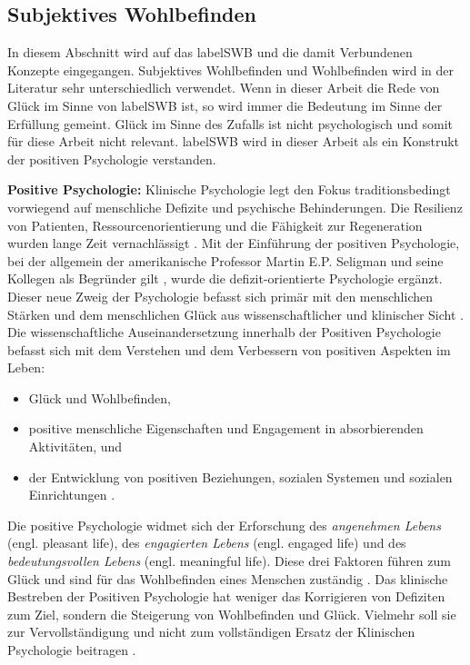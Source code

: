\subsection{Subjektives Wohlbefinden}\label{subsection.subjektivesWohlbefinden}
In diesem Abschnitt wird auf das \gls{labelSWB} und die damit Verbundenen Konzepte eingegangen. Subjektives Wohlbefinden und Wohlbefinden wird in der Literatur sehr unterschiedlich verwendet. Wenn in dieser Arbeit die Rede von Glück im Sinne von \gls{labelSWB} ist, so wird immer die Bedeutung im Sinne der Erfüllung gemeint. Glück im Sinne des Zufalls ist nicht psychologisch und somit für diese Arbeit nicht relevant. \Gls{labelSWB} wird in dieser Arbeit als ein Konstrukt der positiven Psychologie verstanden. 
\par
\textbf{Positive Psychologie:} 
Klinische Psychologie legt den Fokus traditionsbedingt vorwiegend auf menschliche Defizite und psychische Behinderungen. Die Resilienz von Patienten, Ressourcenorientierung und die Fähigkeit zur Regeneration wurden lange Zeit vernachlässigt \cite{Carr2011}. Mit der Einführung der positiven Psychologie, bei der allgemein der amerikanische Professor Martin E.P. Seligman und seine Kollegen als Begründer gilt \cite{Seligman2003}, wurde die defizit-orientierte Psychologie ergänzt. Dieser neue Zweig der Psychologie befasst sich primär mit den menschlichen Stärken und dem menschlichen Glück aus wissenschaftlicher und klinischer Sicht \cite{Carr2011}. Die wissenschaftliche Auseinandersetzung innerhalb der Positiven Psychologie befasst sich mit dem Verstehen und dem Verbessern von positiven Aspekten im Leben:
\begin{itemize}
    \item Glück und Wohlbefinden,
    \item positive menschliche Eigenschaften und Engagement in absorbierenden Aktivitäten, und
    \item der Entwicklung von positiven Beziehungen, sozialen Systemen und sozialen Einrichtungen \cite{Lopez2009, Seligman2003}.
\end{itemize}
Die positive Psychologie widmet sich der Erforschung des \textit{angenehmen Lebens} (engl. pleasant life), des \textit{engagierten Lebens} (engl. engaged life) und des \textit{bedeutungsvollen Lebens} (engl. meaningful life). Diese drei Faktoren führen zum Glück und sind für das Wohlbefinden eines Menschen zuständig \cite{Peterson2005}. Das klinische Bestreben der Positiven Psychologie hat weniger das Korrigieren von Defiziten zum Ziel, sondern die Steigerung von Wohlbefinden und Glück. Vielmehr soll sie zur Vervollständigung und nicht zum vollständigen Ersatz der Klinischen Psychologie beitragen \cite{Carr2011}.
